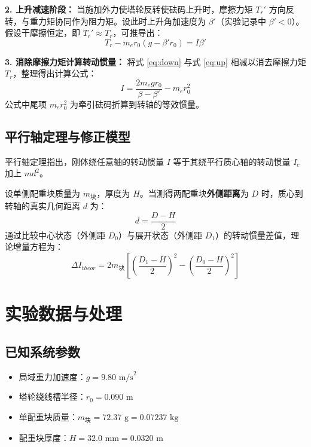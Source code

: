 \documentclass[11pt, a4paper, twocolumn]{article}
\begin{document}
	\textbf{2. 上升减速阶段：}
	当施加外力使塔轮反转使砝码上升时，摩擦力矩 $T_r'$ 方向反转，与重力矩协同作为阻力矩。设此时上升角加速度为 $\beta'$（实验记录中 $\beta' < 0$）。假设干摩擦恒定，即 $T_r' \approx T_r$，可推导出：
	\begin{equation}
		T_r - m_e r_0 (g - \beta' r_0) = I \beta' \label{eq:up}
	\end{equation}
	
	\textbf{3. 消除摩擦力矩计算转动惯量：}
	将式 \eqref{eq:down} 与式 \eqref{eq:up} 相减以消去摩擦力矩 $T_r$，整理得出计算公式：
	\begin{equation}
		I = \frac{2 m_e g r_0}{\beta - \beta'} - m_e r_0^2 \label{eq:I}
	\end{equation}
	公式中尾项 $m_e r_0^2$ 为牵引砝码折算到转轴的等效惯量。
	
	\subsection{平行轴定理与修正模型}
	平行轴定理指出，刚体绕任意轴的转动惯量 $I$ 等于其绕平行质心轴的转动惯量 $I_c$ 加上 $m d^2$。
	
	设单侧配重块质量为 $m_{\text{块}}$，厚度为 $H$。当测得两配重块\textbf{外侧距离}为 $D$ 时，质心到转轴的真实几何距离 $d$ 为：
	\begin{equation}
		d = \frac{D - H}{2}
	\end{equation}
	通过比较中心状态（外侧距 $D_0$）与展开状态（外侧距 $D_1$）的转动惯量差值，理论增量方程为：
	\begin{equation}
		\Delta I_{theor} = 2 m_{\text{块}} \left[ \left(\frac{D_1 - H}{2}\right)^2 - \left(\frac{D_0 - H}{2}\right)^2 \right] \label{eq:parallel}
	\end{equation}
	
	\section{实验数据与处理}
	
	\subsection{已知系统参数}
	\begin{itemize}
		\item 局域重力加速度：$g = 9.80\text{ m/s}^2$
		\item 塔轮绕线槽半径：$r_0 = 0.090\text{ m}$
		\item 单配重块质量：$m_{\text{块}} = 72.37\text{ g} = 0.07237\text{ kg}$
		\item 配重块厚度：$H = 32.0\text{ mm} = 0.0320\text{ m}$
	\end{itemize}
	
\end{document}
